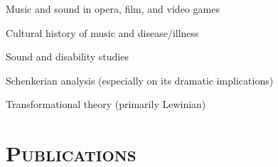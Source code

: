 \documentclass[a4paper,11pt]{article}
\begin{document}
  \hspace{2mm} \textbullet \hspace{2mm} Music and sound in opera, film, and video games
  
  \noindent \hspace{2mm} \textbullet \hspace{2mm} Cultural history of music and disease/illness
  
  \noindent \hspace{2mm} \textbullet \hspace{2mm} Sound and disability studies
  
  \noindent \hspace{2mm} \textbullet \hspace{2mm} Schenkerian analysis (especially on its dramatic implications)
  
  \noindent \hspace{2mm} \textbullet \hspace{2mm} Transformational theory (primarily Lewinian)
  
  
  \section*{\textsc{Publications}}
\end{document}
